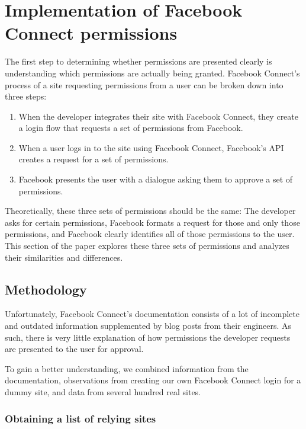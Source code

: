 \documentclass[10pt]{sig-alternate-10pt}
\begin{document}
\section{Implementation of Facebook Connect permissions}

The first step to determining whether permissions are presented clearly is understanding which permissions are actually being granted. Facebook Connect's process of a site requesting permissions from a user can be broken down into three steps:

\begin{enumerate}
  \item When the developer integrates their site with Facebook Connect, they create a login flow that requests a set of permissions from Facebook.
  \item When a user logs in to the site using Facebook Connect, Facebook's API creates a request for a set of permissions.
  \item Facebook presents the user with a dialogue asking them to approve a set of permissions.
\end{enumerate}

Theoretically, these three sets of permissions should be the same: The developer asks for certain permissions, Facebook formats a request for those and only those permissions, and Facebook clearly identifies all of those permissions to the user. This section of the paper explores these three sets of permissions and analyzes their similarities and differences.

\subsection{Methodology}

Unfortunately, Facebook Connect's documentation \cite{fbdocs} consists of a lot of incomplete and outdated information supplemented by blog posts from their engineers. As such, there is very little explanation of how permissions the developer requests are presented to the user for approval.

To gain a better understanding, we combined information from the documentation, observations from creating our own Facebook Connect login for a dummy site, and data from several hundred real sites.

\subsubsection{Obtaining a list of relying sites}
\end{document}
